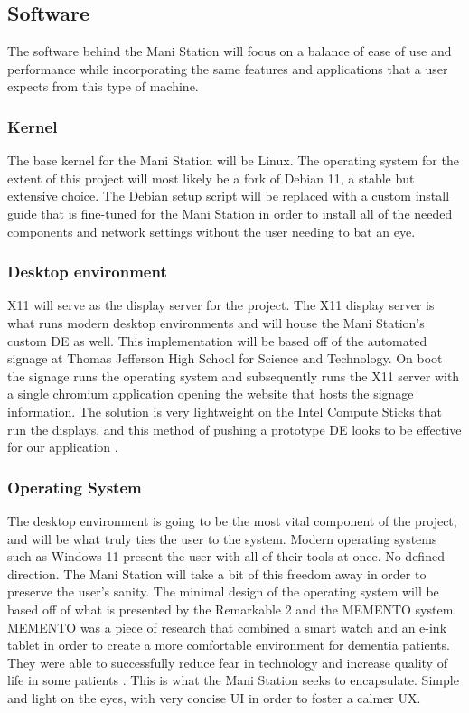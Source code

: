 \documentclass[letterpaper,twocolumn,10pt]{article}
\begin{document}
\subsection{Software}
The software behind the Mani Station will focus on a balance of ease of use and performance while incorporating the same features and applications that a user expects from this type of machine.
\subsubsection{Kernel}
The base kernel for the Mani Station will be Linux. The operating system for the extent of this project will most likely be a fork of Debian 11, a stable but extensive choice. The Debian setup script will be replaced with a custom install guide that is fine-tuned for the Mani Station in order to install all of the needed components and network settings without the user needing to bat an eye.
\subsubsection{Desktop environment}
X11 will serve as the display server for the project. The X11 display server is what runs modern desktop environments and will house the Mani Station's custom DE as well. This implementation will be based off of the automated signage at Thomas Jefferson High School for Science and Technology. On boot the signage runs the operating system and subsequently runs the X11 server with a single chromium application opening the website that hosts the signage information. The solution is very lightweight on the Intel Compute Sticks that run the displays, and this method of pushing a prototype DE looks to be effective for our application \cite{signage}.
\subsubsection{Operating System}
The desktop environment is going to be the most vital component of the project, and will be what truly ties the user to the system. Modern operating systems such as Windows 11 present the user with all of their tools at once. No defined direction. The Mani Station will take a bit of this freedom away in order to preserve the user's sanity. The minimal design of the operating system will be based off of what is presented by the Remarkable 2 and the MEMENTO system. MEMENTO was a piece of research that combined a smart watch and an e-ink tablet in order to create a more comfortable environment for dementia patients. They were able to successfully reduce fear in technology and increase quality of life in some patients \cite{dementiaux}. This is what the Mani Station seeks to encapsulate. Simple and light on the eyes, with very concise UI in order to foster a calmer UX.
\end{document}
